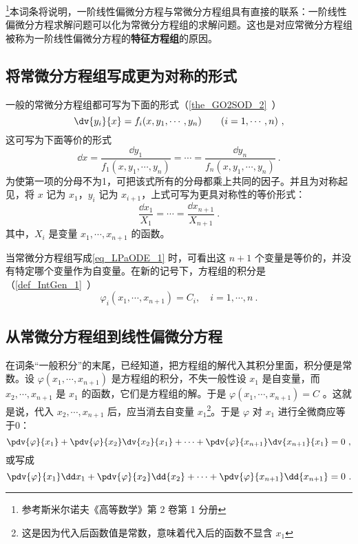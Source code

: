 \footnote{参考斯米尔诺夫《高等数学》第 2 卷第 1 分册}本词条将说明，一阶线性偏微分方程与常微分方程组具有直接的联系：一阶线性偏微分方程求解问题可以化为常微分方程组的求解问题。这也是对应常微分方程组被称为一阶线性偏微分方程的\textbf{特征方程组}的原因。
\subsection{将常微分方程组写成更为对称的形式}
一般的常微分方程组都可写为下面的形式（\autoref{the_GO2SOD_2}~）
\begin{equation}\label{eq_LPaODE_4}
\dv{y_i}{x}=f_i(x,y_1,\cdots,y_n) \qquad (i=1,\cdots,n)~,
\end{equation}
这可写为下面等价的形式
\begin{equation}
\dd x=\frac{\dd y_1}{f_1(x,y_1,\cdots,y_n)}=\cdots=\frac{\dd y_n}{f_n(x,y_1,\cdots,y_n)}~.
\end{equation}
为使第一项的分母不为1，可把该式所有的分母都乘上共同的因子。并且为对称起见，将 $x$ 记为 $x_1$，$y_i$ 记为 $x_{i+1}$，上式可写为更具对称性的等价形式：
\begin{equation}\label{eq_LPaODE_1}
\frac{\dd x_1}{X_1}=\cdots=\frac{\dd x_{n+1}}{X_{n+1}}~.
\end{equation}
其中，$X_i$ 是变量 $x_1,\cdots,x_{n+1}$ 的函数。

当常微分方程组写成\autoref{eq_LPaODE_1} 时，可看出这 $n+1$ 个变量是等价的，并没有特定哪个变量作为自变量。在新的记号下，方程组的积分是（\autoref{def_IntGen_1}~）
\begin{equation}
\varphi_i(x_1,\cdots,x_{n+1})=C_i,\quad i=1,\cdots,n~.
\end{equation}
\subsection{从常微分方程组到线性偏微分方程}
在词条“一般积分”的末尾，已经知道，把方程组的解代入其积分里面，积分便是常数。设 $\varphi(x_1,\cdots,x_{n+1})$ 是方程组的积分，不失一般性设 $x_1$ 是自变量，而 $x_2,\cdots,x_{n+1}$ 是 $x_1$ 的函数，它们是方程组的解。于是 $\varphi(x_1,\cdots,x_{n+1})=C$ 。这就是说，代入 $x_2,\cdots,x_{n+1}$ 后，应当消去自变量 $x_1$\footnote{这是因为代入后函数值是常数，意味着代入后的函数不显含 $x_1$}。于是 $\varphi$ 对 $x_1$ 进行全微商应等于0：
\begin{equation}
\pdv{\varphi}{x_1}+\pdv{\varphi}{x_2}\dv{x_2}{x_1}+\cdots+\pdv{\varphi}{x_{n+1}}\dv{x_{n+1}}{x_1}=0~,
\end{equation}
或写成
\begin{equation}\label{eq_LPaODE_2}
\pdv{\varphi}{x_1}\dd x_1+\pdv{\varphi}{x_2}\dd{x_2}+\cdots+\pdv{\varphi}{x_{n+1}}\dd{x_{n+1}}=0~.
\end{equation}

